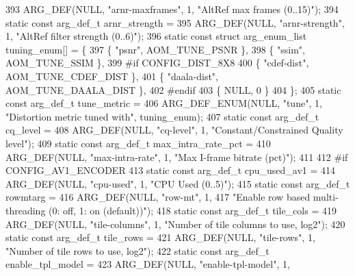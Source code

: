 \begin{DoxyCodeInclude}
{{{{{{{393     ARG\_DEF(NULL, \textcolor{stringliteral}{"arnr-maxframes"}, 1, \textcolor{stringliteral}{"AltRef max frames (0..15)"});
394 \textcolor{keyword}{static} \textcolor{keyword}{const} arg\_def\_t arnr\_strength =
395     ARG\_DEF(NULL, \textcolor{stringliteral}{"arnr-strength"}, 1, \textcolor{stringliteral}{"AltRef filter strength (0..6)"});
396 \textcolor{keyword}{static} \textcolor{keyword}{const} \textcolor{keyword}{struct }arg\_enum\_list tuning\_enum[] = \{
397   \{ \textcolor{stringliteral}{"psnr"}, AOM\_TUNE\_PSNR \},
398   \{ \textcolor{stringliteral}{"ssim"}, AOM\_TUNE\_SSIM \},
399 \textcolor{preprocessor}{#if CONFIG\_DIST\_8X8}
400   \{ \textcolor{stringliteral}{"cdef-dist"}, AOM\_TUNE\_CDEF\_DIST \},
401   \{ \textcolor{stringliteral}{"daala-dist"}, AOM\_TUNE\_DAALA\_DIST \},
402 \textcolor{preprocessor}{#endif}
403   \{ NULL, 0 \}
404 \};
405 \textcolor{keyword}{static} \textcolor{keyword}{const} arg\_def\_t tune\_metric =
406     ARG\_DEF\_ENUM(NULL, \textcolor{stringliteral}{"tune"}, 1, \textcolor{stringliteral}{"Distortion metric tuned with"}, tuning\_enum);
407 \textcolor{keyword}{static} \textcolor{keyword}{const} arg\_def\_t cq\_level =
408     ARG\_DEF(NULL, \textcolor{stringliteral}{"cq-level"}, 1, \textcolor{stringliteral}{"Constant/Constrained Quality level"});
409 \textcolor{keyword}{static} \textcolor{keyword}{const} arg\_def\_t max\_intra\_rate\_pct =
410     ARG\_DEF(NULL, \textcolor{stringliteral}{"max-intra-rate"}, 1, \textcolor{stringliteral}{"Max I-frame bitrate (pct)"});
411 
412 \textcolor{preprocessor}{#if CONFIG\_AV1\_ENCODER}
413 \textcolor{keyword}{static} \textcolor{keyword}{const} arg\_def\_t cpu\_used\_av1 =
414     ARG\_DEF(NULL, \textcolor{stringliteral}{"cpu-used"}, 1, \textcolor{stringliteral}{"CPU Used (0..5)"});
415 \textcolor{keyword}{static} \textcolor{keyword}{const} arg\_def\_t rowmtarg =
416     ARG\_DEF(NULL, \textcolor{stringliteral}{"row-mt"}, 1,
417             \textcolor{stringliteral}{"Enable row based multi-threading (0: off, 1: on (default))"});
418 \textcolor{keyword}{static} \textcolor{keyword}{const} arg\_def\_t tile\_cols =
419     ARG\_DEF(NULL, \textcolor{stringliteral}{"tile-columns"}, 1, \textcolor{stringliteral}{"Number of tile columns to use, log2"});
420 \textcolor{keyword}{static} \textcolor{keyword}{const} arg\_def\_t tile\_rows =
421     ARG\_DEF(NULL, \textcolor{stringliteral}{"tile-rows"}, 1, \textcolor{stringliteral}{"Number of tile rows to use, log2"});
422 \textcolor{keyword}{static} \textcolor{keyword}{const} arg\_def\_t enable\_tpl\_model =
423     ARG\_DEF(NULL, \textcolor{stringliteral}{"enable-tpl-model"}, 1,
}}}}}}}
\end{DoxyCodeInclude}
